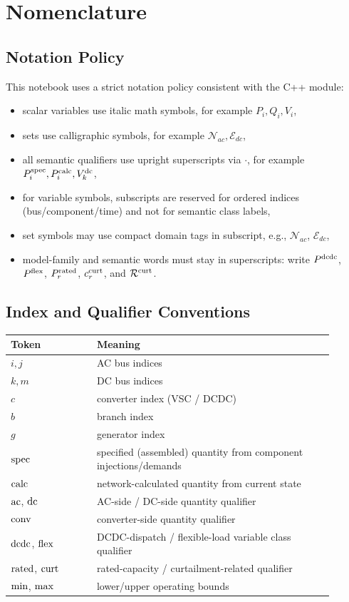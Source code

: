 \section{Nomenclature}
\label{sec:nomenclature}

\subsection{Notation Policy}

This notebook uses a strict notation policy consistent with the C++ module:
\begin{itemize}
  \item scalar variables use italic math symbols, for example \(P_i, Q_i, V_i\),
  \item sets use calligraphic symbols, for example \(\mathcal{N}_{ac}, \mathcal{E}_{dc}\),
  \item all semantic qualifiers use upright superscripts via \(\mathrm{\cdot}\), for example \(P_i^{\mathrm{spec}}, P_i^{\mathrm{calc}}, V_k^{\mathrm{dc}}\),
  \item for variable symbols, subscripts are reserved for ordered indices (bus/component/time) and not for semantic class labels,
  \item set symbols may use compact domain tags in subscript, e.g., \(\mathcal{N}_{ac}\), \(\mathcal{E}_{dc}\),
  \item model-family and semantic words must stay in superscripts: write \(P^{\mathrm{dcdc}}\), \(P^{\mathrm{flex}}\), \(P_r^{\mathrm{rated}}\), \(c_r^{\mathrm{curt}}\), and \(\mathcal{R}^{\mathrm{curt}}\).
\end{itemize}

\subsection{Index and Qualifier Conventions}

\begin{longtable}{L{0.24\linewidth}L{0.66\linewidth}}
\toprule
Token & Meaning \\
\midrule
\endhead
\(i,j\) & AC bus indices \\
\(k,m\) & DC bus indices \\
\(c\) & converter index (VSC / DCDC) \\
\(b\) & branch index \\
\(g\) & generator index \\
\(\mathrm{spec}\) & specified (assembled) quantity from component injections/demands \\
\(\mathrm{calc}\) & network-calculated quantity from current state \\
\(\mathrm{ac}\), \(\mathrm{dc}\) & AC-side / DC-side quantity qualifier \\
\(\mathrm{conv}\) & converter-side quantity qualifier \\
\(\mathrm{dcdc}\), \(\mathrm{flex}\) & DCDC-dispatch / flexible-load variable class qualifier \\
\(\mathrm{rated}\), \(\mathrm{curt}\) & rated-capacity / curtailment-related qualifier \\
\(\mathrm{min}\), \(\mathrm{max}\) & lower/upper operating bounds \\
\bottomrule
\end{longtable}

